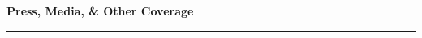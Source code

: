 \documentclass[11pt]{article}
\makeatletter
\def\vhrulefill#1{\leavevmode\leaders\hrule \@height #1\hfill \kern\z@}
\newcommand{\subsectionname}[1]{{\large\bf #1 \vhrulefill{0.5pt}}}
\makeatother
\begin{document}
\begin{longtable}{p{} p{}p{}}




\end{longtable}


%
%
%
%
%




\vspace{-12pt}
\subsectionname{Press, Media, \& Other Coverage}\vspace{-6pt}
\end{document}
